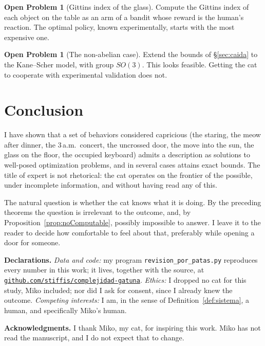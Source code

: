 \documentclass[11pt,a4paper]{article}
\theoremstyle{plain}
\theoremstyle{definition}
\newtheorem{problema}[teorema]{Open Problem}
\theoremstyle{remark}
\numberwithin{equation}{section}
\begin{document}
\begin{problema}[Gittins index of the glass]
Compute the Gittins index of each object on the table as an arm of a bandit whose reward is the human's reaction. The optimal policy, known experimentally, starts with the most expensive one.
\end{problema}

\begin{problema}[The non-abelian case]
Extend the bounds of \S\ref{sec:caida} to the Kane--Scher model, with group $SO(3)$. This looks feasible. Getting the cat to cooperate with experimental validation does not.
\end{problema}

\section{Conclusion}

I have shown that a set of behaviors considered capricious (the staring, the meow after dinner, the 3\,a.m.\ concert, the uncrossed door, the move into the sun, the glass on the floor, the occupied keyboard) admits a description as solutions to well-posed optimization problems, and in several cases attains exact bounds. The title of expert is not rhetorical: the cat operates on the frontier of the possible, under incomplete information, and without having read any of this.

The natural question is whether the cat knows what it is doing. By the preceding theorems the question is irrelevant to the outcome, and, by Proposition~\ref{prop:noComputable}, possibly impossible to answer. I leave it to the reader to decide how comfortable to feel about that, preferably while opening a door for someone.

\bigskip
\noindent\textbf{Declarations.} \emph{Data and code:} my program \texttt{revision\_por\_patas.py} reproduces every number in this work; it lives, together with the source, at \href{https://github.com/stiffis/complejidad-gatuna}{\nolinkurl{github.com/stiffis/complejidad-gatuna}}. \emph{Ethics:} I dropped no cat for this study, Miko included; nor did I ask for consent, since I already knew the outcome. \emph{Competing interests:} I am, in the sense of Definition~\ref{def:sistema}, a human, and specifically Miko's human.

\medskip
\noindent\textbf{Acknowledgments.} I thank Miko, my cat, for inspiring this work. Miko has not read the manuscript, and I do not expect that to change.
\end{document}
